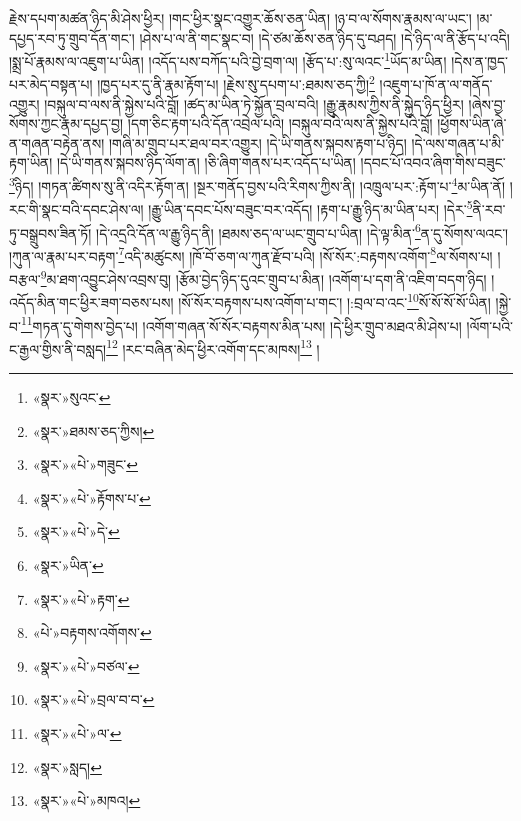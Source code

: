 རྗེས་དཔག་མཚན་ཉིད་མི་ཤེས་ཕྱིར། །གང་ཕྱིར་སྣང་འགྱུར་ཆོས་ཅན་ཡིན། །ཉ་བ་ལ་སོགས་རྣམས་ལ་ཡང་། །མ་དཔྱད་རབ་ཏུ་གྲུབ་དོན་གང་། །ཤེས་པ་ལ་ནི་གང་སྣང་བ། །དེ་ཙམ་ཆོས་ཅན་ཉིད་དུ་བཤད། །དེ་ཉིད་ལ་ནི་རྩོད་པ་འདི། །སྨྲ་པོ་རྣམས་ལ་འཇུག་པ་ཡིན། །འདོད་པས་བཀོད་པའི་བྱེ་བྲག་ལ། །རྩོད་པ་:སུ་ལའང་\footnote{«སྣར་»སུའང་}ཡོད་མ་ཡིན། །དེས་ན་ཁྱད་པར་མེད་བསྟན་པ། །ཁྱད་པར་དུ་ནི་རྣམ་རྟོག་པ། །རྗེས་སུ་དཔག་པ་:ཐམས་ཅད་ཀྱི།\footnote{«སྣར་»ཐམས་ཅད་ཀྱིས།} །འཇུག་པ་ཁོ་ན་ལ་གནོད་འགྱུར། །བསྐུལ་བ་ལས་ནི་སྐྱེས་པའི་བློ། །ཚད་མ་ཡིན་ཏེ་སྐྱོན་བྲལ་བའི། །རྒྱུ་རྣམས་ཀྱིས་ནི་སྐྱེད་ཉིད་ཕྱིར། །ཞེས་བྱ་སོགས་ཀྱང་རྣམ་དཔྱད་བྱ། །དག་ཅིང་རྟག་པའི་དོན་འབྲེལ་པའི། །བསྐུལ་བའི་ལས་ནི་སྐྱེས་པའི་བློ། །ཕྱོགས་ཡིན་ཞེ་ན་གཞན་བརྟེན་ནས། །གཞི་མ་གྲུབ་པར་ཐལ་བར་འགྱུར། །དེ་ཡི་གནས་སྐབས་རྟག་པ་ཉིད། །དེ་ལས་གཞན་པ་མི་རྟག་ཡིན། །དེ་ཡི་གནས་སྐབས་ཉིད་ལོག་ན། །ཅི་ཞིག་གནས་པར་འདོད་པ་ཡིན། །དབང་པོ་འབའ་ཞིག་གིས་བཟུང་\footnote{«སྣར་»«པེ་»གཟུང་}ཉིད། །གཏན་ཚིགས་སུ་ནི་འདིར་རྟོག་ན། །སྔར་གནོད་བྱས་པའི་རིགས་ཀྱིས་ནི། །འཁྲུལ་པར་:རྟོག་པ་\footnote{«སྣར་»«པེ་»རྟོགས་པ་}མ་ཡིན་ནོ། །རང་གི་སྣང་བའི་དབང་ཤེས་ལ། །རྒྱུ་ཡིན་དབང་པོས་བཟུང་བར་འདོད། །རྟག་པ་རྒྱུ་ཉིད་མ་ཡིན་པར། །དེར་\footnote{«སྣར་»«པེ་»དེ་}ནི་རབ་ཏུ་བསྒྲུབས་ཟིན་ཏོ། །དེ་འདྲའི་དོན་ལ་རྒྱུ་ཉིད་ནི། །ཐམས་ཅད་ལ་ཡང་གྲུབ་པ་ཡིན། །དེ་ལྟ་མིན་\footnote{«སྣར་»ཡིན་}ན་དུ་སོགས་ལའང་། །ཀུན་ལ་རྣམ་པར་བརྟག་\footnote{«སྣར་»«པེ་»རྟག་}འདི་མཚུངས། །ཁོ་བོ་ཅག་ལ་ཀུན་རྫོབ་པའི། །སོ་སོར་:བརྟགས་འགོག་\footnote{«པེ་»བརྟགས་འགོགས་}ལ་སོགས་པ། །བརྩལ་\footnote{«སྣར་»«པེ་»བཙལ་}མ་ཐག་འབྱུང་ཤེས་འབྲས་བུ། །རྩོམ་བྱེད་ཉིད་དུའང་གྲུབ་པ་མིན། །འགོག་པ་དག་ནི་འཇིག་བདག་ཉིད། །འདོད་མིན་གང་ཕྱིར་ཟག་བཅས་པས། །སོ་སོར་བརྟགས་པས་འགོག་པ་གང་། །:བྲལ་བ་འང་\footnote{«སྣར་»«པེ་»བྲལ་བ་བ་}སོ་སོ་སོ་སོ་ཡིན། །སྐྱེ་བ་\footnote{«སྣར་»«པེ་»ལ་}གཏན་དུ་གེགས་བྱེད་པ། །འགོག་གཞན་སོ་སོར་བརྟགས་མིན་པས། །དེ་ཕྱིར་གྲུབ་མཐའ་མི་ཤེས་པ། །ལོག་པའི་ང་རྒྱལ་གྱིས་ནི་བསླད།\footnote{«སྣར་»སླད།} །རང་བཞིན་མེད་ཕྱིར་འགོག་དང་མཁས།\footnote{«སྣར་»«པེ་»མཁའ།} །
